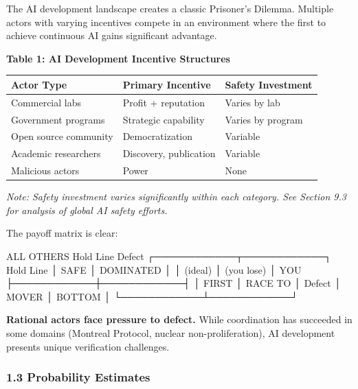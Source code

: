 \documentclass[
]{article}
\newenvironment{Shaded}{}{}
\newcommand{\NormalTok}[1]{#1}
\begin{document}
The AI development landscape creates a classic Prisoner's Dilemma.
Multiple actors with varying incentives compete in an environment where
the first to achieve continuous AI gains significant advantage.

\textbf{Table 1: AI Development Incentive Structures}

\begin{longtable}[]{@{}lll@{}}
\toprule\noalign{}
Actor Type & Primary Incentive & Safety Investment \\
\midrule\noalign{}
\endhead
\bottomrule\noalign{}
\endlastfoot
Commercial labs & Profit + reputation & Varies by lab \\
Government programs & Strategic capability & Varies by program \\
Open source community & Democratization & Variable \\
Academic researchers & Discovery, publication & Variable \\
Malicious actors & Power & None \\
\end{longtable}

\emph{Note: Safety investment varies significantly within each category.
See Section 9.3 for analysis of global AI safety efforts.}

The payoff matrix is clear:

\begin{Shaded}
\begin{Highlighting}[]
\NormalTok{                         ALL OTHERS}
\NormalTok{                     Hold Line    Defect}
\NormalTok{                  ┌────────────┬────────────┐}
\NormalTok{      Hold Line   │   SAFE     │ DOMINATED  │}
\NormalTok{                  │  (ideal)   │ (you lose) │}
\NormalTok{  YOU             ├────────────┼────────────┤}
\NormalTok{                  │   FIRST    │  RACE TO   │}
\NormalTok{      Defect      │   MOVER    │   BOTTOM   │}
\NormalTok{                  └────────────┴────────────┘}
\end{Highlighting}
\end{Shaded}

\textbf{Rational actors face pressure to defect.} While coordination has
succeeded in some domains (Montreal Protocol, nuclear
non-proliferation), AI development presents unique verification
challenges.

\hypertarget{probability-estimates}{%
\subsubsection{1.3 Probability Estimates}\label{probability-estimates}}
\end{document}
